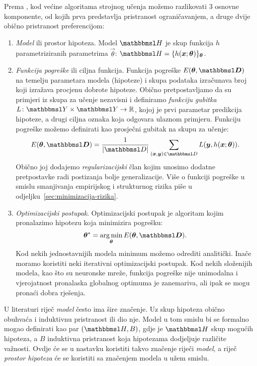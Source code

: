 \documentclass[utf8, diplomski, lmodern]{fer}
\begin{document}
Prema \citet{Snajder:2014:SU}, kod većine algoritama strojnog učenja možemo razlikovati $3$ osnovne komponente, od kojih prva predstavlja pristranost ograničavanjem, a druge dvije obično pristranost preferencijom:
\begin{enumerate}
	\item \emph{Model} ili prostor hipoteza. Model $\set H$ je skup funkcija $h$  parametriziranih parametrima $\vec\theta$: $\set H=\cbr{h(\vec x;\vec{\theta})}_{\vec{\theta}}$.
	\item \emph{Funkcija pogreške} ili ciljna funkcija. Funkcija pogreške $E(\vec{\theta,\set D})$ na temelju parametara modela (hipoteze) i skupa podataka izračunava broj koji izražava procjenu dobrote hipoteze. Obično pretpostavljamo da su primjeri iz skupa za učenje nezavisni i definiramo \emph{funkciju gubitka} $\funcdef{L}{\set Y\times\set Y}{\R}$, kojoj je prvi parametar predikcija hipoteze, a drugi ciljna oznaka koja odgovara ulaznom primjeru. Funkciju pogreške možemo definirati kao prosječni gubitak na skupu za učenje:
	\begin{align}
	E(\vec{\theta,\set D})=\frac{1}{\envert{\set D}}\sum_{(\vec x,\vec y)\in\set D} L(\vec y,h(\vec x;\vec{\theta})) \text{.}
	\end{align}
	Obično joj dodajemo \emph{regularizacijski} član kojim unosimo dodatne pretpostavke radi postizanja bolje generalizacije. Više o funkciji pogreške u smislu smanjivanja empirijskog i strukturnog rizika piše u odjeljku~\ref{sec:minimizacija-rizika}.
	\item \emph{Optimizacijski postupak}. Optimizacijski postupak je algoritam kojim pronalazimo hipotezu koja minimizira pogrešku:
	\begin{align}
	\vec\theta^* = \argmin_{\vec{\theta}} E(\vec{\theta,\set D}) \text{.}
	\end{align}
	Kod nekih jednostavnijih modela minimum možemo odrediti analitički. Inače moramo koristiti neki iterativni optimizacijski postupak. Kod nekih složenijih modela, kao što su neuronske mreže, funkcija pogreške nije unimodalna i vjerojatnost pronalaska globalnog optimuma je zanemariva, ali ipak se mogu pronaći dobra rješenja.
\end{enumerate}

U literaturi riječ \textit{model} često ima šire značenje. Uz skup hipoteza obično obuhvaća i induktivnu pristranost ili dio nje. Model u tom smislu bi se formalno mogao definirati kao par $(\set H, B)$, gdje je $\set H$ skup mogućih hipoteza, a $B$ induktivna pristranost koja hipotezama dodjeljuje različite važnosti. Ovdje će se u nastavku koristiti takvo značenje riječi \textit{model}, a riječ \textit{prostor hipoteza} će se koristiti sa značenjem modela u užem smislu.
\end{document}

